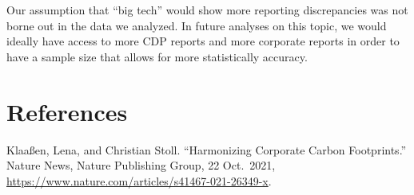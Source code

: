 \documentclass[
  12pt,
]{article}
\begin{document}
Our assumption that ``big tech'' would show more reporting discrepancies
was not borne out in the data we analyzed. In future analyses on this
topic, we would ideally have access to more CDP reports and more
corporate reports in order to have a sample size that allows for more
statistically accuracy.

\newpage

\hypertarget{references}{%
\section{References}\label{references}}

Klaaßen, Lena, and Christian Stoll. ``Harmonizing Corporate Carbon
Footprints.'' Nature News, Nature Publishing Group, 22 Oct.~2021,
\url{https://www.nature.com/articles/s41467-021-26349-x}.
\end{document}
